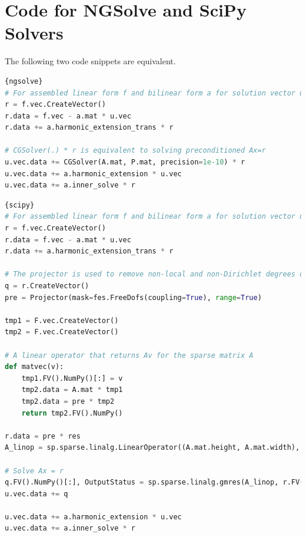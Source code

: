 \documentclass[a4paper,12]{elsarticle}
\theoremstyle{definition}
\begin{document}

\appendix
\section{Code for NGSolve and SciPy Solvers}
The following two code snippets are equivalent.
\clearpage
\begin{lstlisting}[caption=Static condensation using NGSolve,frame=tlrb, language=python]{ngsolve}
# For assembled linear form f and bilinear form a for solution vector u. 
r = f.vec.CreateVector()
r.data = f.vec - a.mat * u.vec
r.data += a.harmonic_extension_trans * r

# CGSolver(.) * r is equivalent to solving preconditioned Ax=r
u.vec.data += CGSolver(A.mat, P.mat, precision=1e-10) * r
u.vec.data += a.harmonic_extension * u.vec
u.vec.data += a.inner_solve * r
\end{lstlisting}

\begin{lstlisting}[caption=Static condensation using SciPy,frame=tlrb, language=python]{scipy}
# For assembled linear form f and bilinear form a for solution vector u. 
r = f.vec.CreateVector()
r.data = f.vec - a.mat * u.vec
r.data += a.harmonic_extension_trans * r

# The projector is used to remove non-local and non-Dirichlet degrees of freedom that should not participate in the solve
q = r.CreateVector()
pre = Projector(mask=fes.FreeDofs(coupling=True), range=True)

tmp1 = F.vec.CreateVector()
tmp2 = F.vec.CreateVector()

# A linear operator that returns Av for the sparse matrix A
def matvec(v):
	tmp1.FV().NumPy()[:] = v
	tmp2.data = A.mat * tmp1
	tmp2.data = pre * tmp2
	return tmp2.FV().NumPy()

r.data = pre * res
A_linop = sp.sparse.linalg.LinearOperator((A.mat.height, A.mat.width), matvec)

# Solve Ax = r
q.FV().NumPy()[:], OutputStatus = sp.sparse.linalg.gmres(A_linop, r.FV().NumPy(), tol=1e-10, M=P.mat)
u.vec.data += q

u.vec.data += a.harmonic_extension * u.vec
u.vec.data += a.inner_solve * r
\end{lstlisting}





\end{document}
